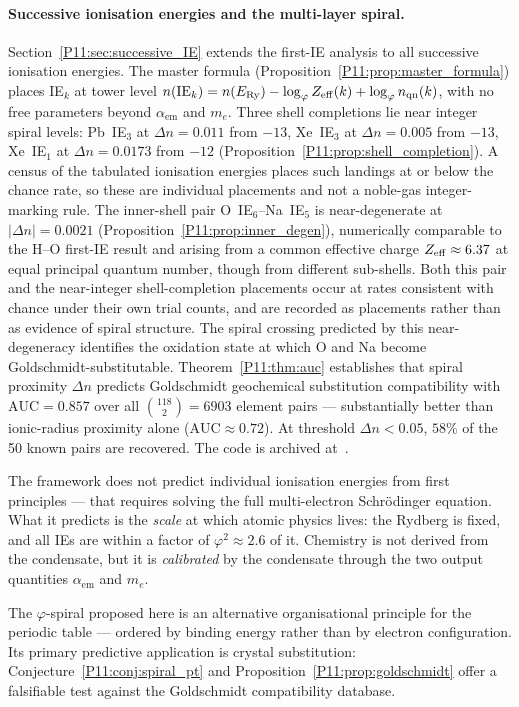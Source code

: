\documentclass[11pt,a4paper]{article}
\theoremstyle{definition}
\theoremstyle{remark}
\newcommand{\vp}{\varphi}
\newcommand{\ERy}{E_{\mathrm{Ry}}}
\newcommand{\aem}{\alpha_{\mathrm{em}}}
\newcommand{\nlvl}[1]{n\!\left(#1\right)}
\newcommand{\IE}{\mathrm{IE}}
\begin{document}
\paragraph{Successive ionisation energies and the multi-layer spiral.}
Section~\ref{P11:sec:successive_IE} extends the first-IE analysis to
all successive ionisation energies.
The master formula (Proposition~\ref{P11:prop:master_formula}) places
IE$_k$ at tower level
$\nlvl{\IE_k}=\nlvl{\ERy}-\log_\vp Z_{\rm eff}(k)+\log_\vp n_{\rm qn}(k)$,
with no free parameters beyond $\aem$ and $m_e$.
Three shell completions lie near integer spiral levels: Pb~IE$_3$ at
$\Delta n=0.011$ from $-13$, Xe~IE$_3$ at $\Delta n=0.005$ from $-13$,
Xe~IE$_1$ at $\Delta n=0.0173$ from $-12$
(Proposition~\ref{P11:prop:shell_completion}).  A census of the
tabulated ionisation energies places such landings at or below the
chance rate, so these are individual placements and not a
noble-gas integer-marking rule.
The inner-shell pair O~IE$_6$--Na~IE$_5$ is near-degenerate at
$|\Delta n|=0.0021$ (Proposition~\ref{P11:prop:inner_degen}),
numerically comparable to the H--O first-IE result and arising from a
common effective charge $Z_{\rm eff}\approx6.37$ at equal principal
quantum number, though from different sub-shells.  Both this pair and
the near-integer shell-completion placements occur at rates consistent
with chance under their own trial counts, and are recorded as
placements rather than as evidence of spiral structure.  The spiral crossing predicted by this near-degeneracy
identifies the oxidation state at which O and Na become
Goldschmidt-substitutable.
Theorem~\ref{P11:thm:auc} establishes that spiral proximity $\Delta n$ predicts
Goldschmidt geochemical substitution compatibility with
$\mathrm{AUC}=0.857$ over all $\binom{118}{2}=6903$ element pairs ---
substantially better than ionic-radius proximity alone
($\mathrm{AUC}\approx0.72$).
At threshold $\Delta n<0.05$, $58\%$ of the 50 known pairs are recovered.
The code is archived at~\cite{Zenodo_P11}.

The framework does not predict individual ionisation energies
from first principles --- that requires solving the full
multi-electron Schr\"{o}dinger equation.
What it predicts is the \emph{scale} at which atomic physics lives:
the Rydberg is fixed, and all IEs are within a factor of
$\vp^2 \approx 2.6$ of it.
Chemistry is not derived from the condensate, but it is
\emph{calibrated} by the condensate through the two output
quantities $\aem$ and $m_e$.

The $\vp$-spiral proposed here is an alternative organisational
principle for the periodic table --- ordered by binding energy
rather than by electron configuration.
Its primary predictive application is crystal substitution:
Conjecture~\ref{P11:conj:spiral_pt} and Proposition~\ref{P11:prop:goldschmidt}
offer a falsifiable test against the Goldschmidt compatibility database.
\end{document}
